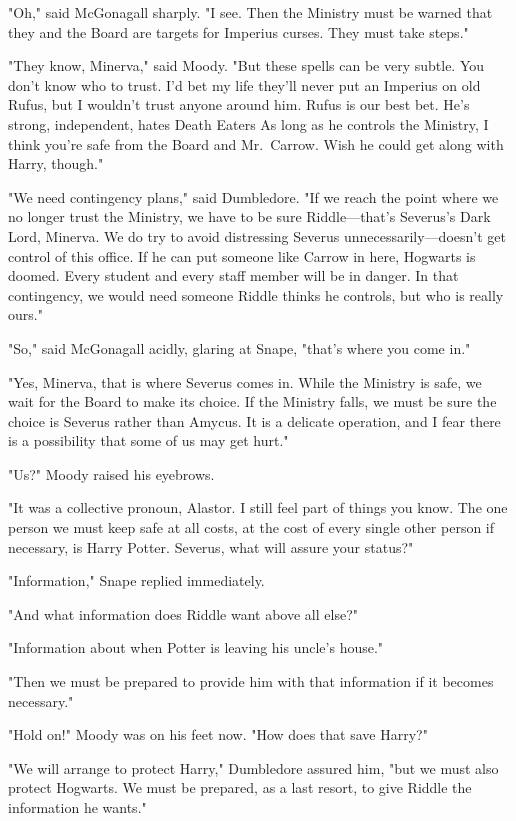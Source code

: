 "Oh," said McGonagall sharply. "I see. Then the Ministry must be warned that they and the Board are targets for Imperius curses. They must take steps."

"They know, Minerva," said Moody. "But these spells can be very subtle. You don't know who to trust. I'd bet my life they'll never put an Imperius on old Rufus, but I wouldn't trust anyone around him. Rufus is our best bet. He's strong, independent, hates Death Eaters{\el} As long as he controls the Ministry, I think you're safe from the Board and Mr.~Carrow. Wish he could get along with Harry, though."

"We need contingency plans," said Dumbledore. "If we reach the point where we no longer trust the Ministry, we have to be sure Riddle—that's Severus's Dark Lord, Minerva. We do try to avoid distressing Severus unnecessarily—doesn't get control of this office. If he can put someone like Carrow in here, Hogwarts is doomed. Every student and every staff member will be in danger. In that contingency, we would need someone Riddle thinks he controls, but who is really ours."

"So," said McGonagall acidly, glaring at Snape, "that's where you come in."

"Yes, Minerva, that is where Severus comes in. While the Ministry is safe, we wait for the Board to make its choice. If the Ministry falls, we must be sure the choice is Severus rather than Amycus. It is a delicate operation, and I fear there is a possibility that some of us may get hurt."

"Us?" Moody raised his eyebrows.

"It was a collective pronoun, Alastor. I still feel part of things you know. The one person we must keep safe at all costs, at the cost of every single other person if necessary, is Harry Potter. Severus, what will assure your status?"

"Information," Snape replied immediately.

"And what information does Riddle want above all else?"

"Information about when Potter is leaving his uncle's house."

"Then we must be prepared to provide him with that information if it becomes necessary."

"Hold on!" Moody was on his feet now. "How does that save Harry?"

"We will arrange to protect Harry," Dumbledore assured him, "but we must also protect Hogwarts. We must be prepared, as a last resort, to give Riddle the information he wants."

